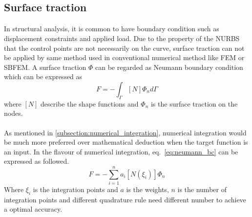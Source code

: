 \subsection{Surface traction}
\label{subsection:surface_traction}
\paragraph{}
In structural analysis, it is common to have boundary condition such as displacement constraints and applied load.
Due to the property of the NURBS that the control points are not necessarily on the curve, surface traction can not be
    applied by same method used in conventional numerical method like FEM or SBFEM.
A surface traction $\Phi$ can be regarded as Neumann boundary condition which can be expressed as
    \begin{equation}
        {F}=-\int_{\Gamma}
        [N]
        \Phi_n
        d\Gamma
    \label{eq:neumann_bc}
    \end{equation}
where $[N]$ describe the shape functions and $\Phi_n$ is the surface traction on the nodes.

\paragraph{}
As mentioned in \ref{subsection:numerical_integration}, numerical integration would be much more preferred over mathematical deduction
when the target function is an input. In the flavour of numerical integration, eq.~\ref{eq:neumann_bc} can be expressed as followed.
    \begin{equation}
        {F}=-\sum_{i=1}^n
        a_i
        [N(\xi_i)]
        \Phi_n
    \label{eq:neumann_bc_numerical}
    \end{equation}
Where $\xi_i$ is the integration points and $a$ is the weights,
$n$ is the number of integration points and different quadrature rule need different number to achieve a optimal accuracy.

